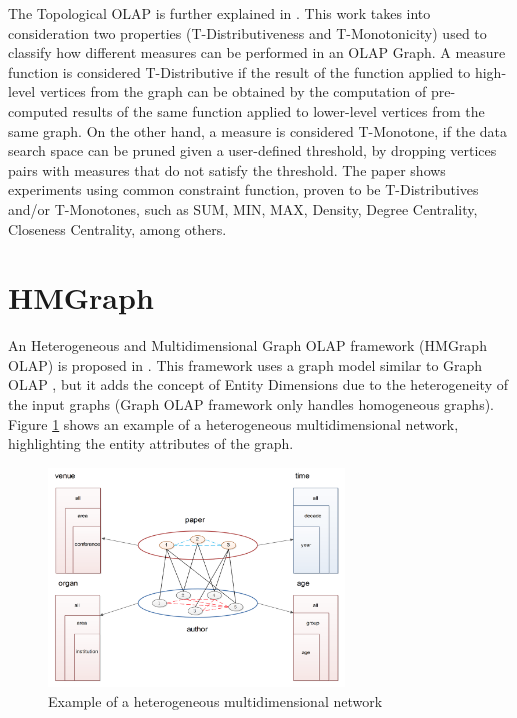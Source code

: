 The Topological OLAP is further explained in \cite{Qu2011}. This work takes into consideration two properties (T-Distributiveness and T-Monotonicity) used to classify how different measures can be performed in an OLAP Graph. A measure function is considered T-Distributive if the result of the function applied to high-level vertices from the graph can be obtained by the computation of pre-computed results of the same function applied to lower-level vertices from the same graph. On the other hand, a measure is considered T-Monotone, if the data search space can be pruned given a user-defined threshold, by dropping vertices pairs with measures that do not satisfy the threshold. The paper shows experiments using common constraint function, proven to be T-Distributives and/or T-Monotones, such as SUM, MIN, MAX, Density, Degree Centrality, Closeness Centrality, among others.

\section{HMGraph}

An Heterogeneous and Multidimensional Graph OLAP framework (HMGraph OLAP) is proposed in \cite{Yin2012}. This framework uses a graph model similar to Graph OLAP \cite{Chen2008}, but it adds the concept of Entity Dimensions due to the heterogeneity of the input graphs (Graph OLAP framework only handles homogeneous graphs). Figure \ref{fig:figure17} shows an example of a heterogeneous multidimensional network, highlighting the entity attributes of the graph.

\begin{figure}[ht]
\centering
\includegraphics[width=0.7\textwidth]{../heterogeneous_graph_example.png}
\caption{Example of a heterogeneous multidimensional network \cite{Yin2012}}
\label{fig:figure17}
\end{figure}

